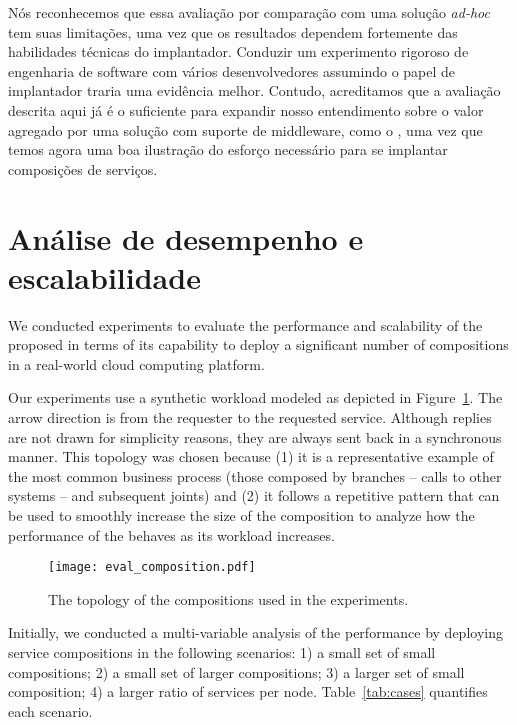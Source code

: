 Nós reconhecemos que essa avaliação por comparação com uma solução \emph{ad-hoc}
tem suas limitações, uma vez que os resultados dependem fortemente das
habilidades técnicas do implantador.
Conduzir um experimento rigoroso de engenharia de software com vários
desenvolvedores assumindo o papel de implantador traria uma evidência melhor.
Contudo, acreditamos que a avaliação descrita aqui já é o suficiente
para expandir nosso entendimento sobre o valor agregado por uma solução
com suporte de middleware, como o \ee, uma vez que temos agora uma boa ilustração
do esforço necessário para se implantar composições de serviços.

\section{Análise de desempenho e escalabilidade}

We conducted experiments to evaluate the performance and scalability of
the proposed \ee in terms of its capability to deploy a significant number of
compositions in a real-world cloud computing platform.

Our experiments use a synthetic workload modeled
as depicted in Figure~\ref{fig:eval_composition}.
The arrow direction is from the requester to the requested service.
Although replies are not drawn for simplicity reasons, they are always sent back
in a synchronous manner.
This topology was chosen because (1) it is a representative example of the most common business process (those composed by branches -- calls to other systems -- and subsequent joints) and (2) it follows a repetitive pattern that can be used to smoothly increase the size of the composition to analyze how the performance of the \ee behaves as its workload increases.

\begin{figure}[h]
  \centering
  \texttt{[image: eval\_composition.pdf]}
  \caption{The topology of the compositions used in the experiments.}
  \label{fig:eval_composition}
\end{figure}


Initially, we conducted a multi-variable analysis of the \ee performance by deploying service compositions
in the following scenarios:
1) a small set of small compositions;
2) a small set of larger compositions;
3) a larger set of small composition;
4) a larger ratio of services per node.
Table~\ref{tab:cases} quantifies each scenario.

